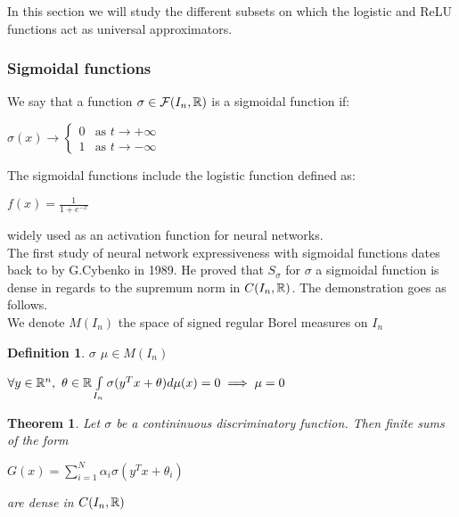 \documentclass[12pt, a4paper]{article}
\newtheorem{theorem}{Theorem}
\newtheorem{definition}{Definition}
\begin{document}
In this section we will study the different subsets on which the logistic and ReLU functions act as universal approximators.\\ 

\subsubsection{Sigmoidal functions}

We say that a function $\sigma \in \mathcal{F}(I_n, \mathbb{R})$ is a sigmoidal function if:

\begin{center}
  $\sigma(x) \to
  \begin{cases}
    0 &\text{as $t \to +\infty$}\\
    1 &\text{as $t \to -\infty$}
  \end{cases}$
\end{center}

The sigmoidal functions include the logistic function defined as:

\begin{center}
  $f(x) = \frac{1}{1+e^{-x}}$
\end{center}

widely used as an activation function for neural networks.\\

The first study of neural network expressiveness with sigmoidal functions dates back to \cite{cybenko_approximation_1989} by G.Cybenko in 1989. He proved that $S_\sigma$ for $\sigma$ a sigmoidal function is dense in regards to the supremum norm in $C(I_n, \mathbb{R})$. The demonstration goes as follows.\\

We denote $M(I_n)$ the space of signed regular Borel measures on $I_n$\\

\begin{definition}
  $\sigma$  $\mu \in M(I_n)$ \\ 
  \begin{center}
  $\forall y \in \mathbb{R}^n,$ $\theta \in \mathbb{R} \int\limits_{I_n} \sigma(y^Tx + \theta) d\mu(x) = 0 \implies \mu = 0$
\end{center}
\end{definition}

\begin{theorem}
  Let $\sigma$ be a contininuous discriminatory function. Then finite sums of the form\\\begin{center}
    $G(x) = \sum\limits_{i=1}^N \alpha_i \sigma(y^Tx + \theta_i)$
  \end{center}
  are dense in $C(I_n, \mathbb{R})$
\end{theorem}
\end{document}
